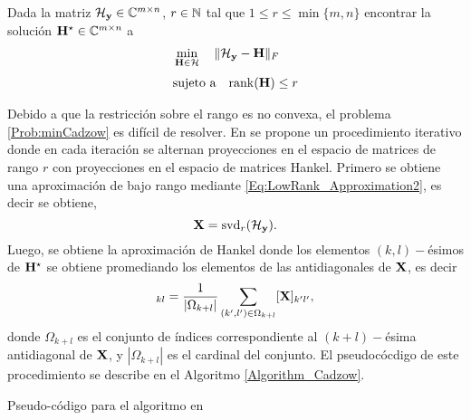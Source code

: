 	\begin{Prob}\label{Prob:minCadzow}
		Dada la matriz $\mathcal{H}_{\mathbf{y}}\in\mathbb{C}^{m\times n}$, $r\in\mathbb{N}$ tal que $1\le r\le \min\{m,n\}$ encontrar la solución $\mathbf{H}^\star\in\mathbb{C}^{m\times n}$ a			
		\begin{equation}
			\begin{aligned}
				& \min_{\mathbf{H}\in\mathcal{H}} \quad \|\mathcal{H}_{\mathbf{y}}-\mathbf{H}\|_F \\[0.3em]
				& \text{sujeto a}\quad \mathrm{rank}(\mathbf{H})\le r
			\end{aligned}
			\label{Eq:minCadzow}
		\end{equation}
	\end{Prob}
	Debido a que la restricción sobre el rango es no convexa, el problema \eqref{Prob:minCadzow} es difícil de resolver. En \cite{Cadzow1988} se propone un procedimiento iterativo donde en cada iteración se alternan proyecciones en el espacio de matrices de rango $r$ con proyecciones en el espacio de matrices Hankel. Primero se obtiene una aproximación de bajo rango mediante \eqref{Eq:LowRank_Approximation2}, es decir se obtiene, 
	\begin{equation}
		\mathbf{X} = \mathrm{svd}_r(\mathcal{H}_{\mathbf{y}}).
	\end{equation}
	Luego, se obtiene la aproximación de Hankel donde los elementos $(k,l)-$ésimos de $\mathbf{H}^\star$ se obtiene promediando los elementos de las antidiagonales de $\mathbf{X}$, es decir
	\begin{equation}
		[\matH^\star]_{kl} = \frac{1}{|\Omega_{k+l}|}\sum_{(k',l')\in\Omega_{k+l}}[\matX]_{k'l'},
		\label{Eq:HankelProjection}
	\end{equation}
	donde $\Omega_{k+l}$ es el conjunto de índices correspondiente al $(k+l)-$ésima antidiagonal de $\mathbf{X}$, y $|\Omega_{k+l}|$ es el cardinal del conjunto. El pseudocócdigo de este procedimiento se describe en el Algoritmo \eqref{Algorithm_Cadzow}. 	
	\begin{algorithm}
		\caption{Pseudo-código para el algoritmo en \cite{Cadzow1988}}
		\begin{algorithmic}[1]
			\EndWhile	
		\end{algorithmic}
		\label{Algorithm_Cadzow}
	\end{algorithm} 

